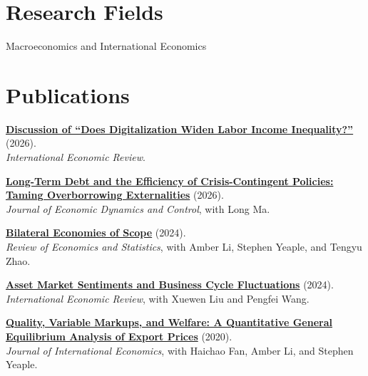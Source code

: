 \documentclass[11pt]{res}
\newcommand{\paper}[3]{\textbf{\href{#1}{#2}} (#3)}
\newenvironment{cvitem}
  {\par\noindent\hspace{-0.42in}\begin{minipage}{\linewidth}}
  {\end{minipage}\par\vspace{0.08in}}
\begin{document}
\begin{resume}
\section{\bf Research Fields}
\vspace{0.1in}
\hspace{-0.42in} Macroeconomics and International Economics

\section{\bf Publications}
\vspace{0.15in}

\begin{cvitem}
\paper{https://doi.org/10.1111/iere.70111}
  {Discussion of ``Does Digitalization Widen Labor Income Inequality?''}{2026}.\\
\textit{International Economic Review}.
\end{cvitem}

\begin{cvitem}
\paper{https://doi.org/10.1016/j.jedc.2025.105253}
  {Long-Term Debt and the Efficiency of Crisis-Contingent Policies:
  Taming Overborrowing Externalities}{2026}.\\
\textit{Journal of Economic Dynamics and Control}, with Long Ma.
\end{cvitem}

\begin{cvitem}
\paper{https://doi.org/10.1162/rest_a_01543}
  {Bilateral Economies of Scope}{2024}.\\
\textit{Review of Economics and Statistics}, with Amber Li, Stephen Yeaple,
and Tengyu Zhao.
\end{cvitem}

\begin{cvitem}
\paper{https://doi.org/10.1111/iere.12700}
  {Asset Market Sentiments and Business Cycle Fluctuations}{2024}.\\
\textit{International Economic Review}, with Xuewen Liu and Pengfei Wang.
\end{cvitem}

\begin{cvitem}
\paper{https://doi.org/10.1016/j.jinteco.2020.103317}
  {Quality, Variable Markups, and Welfare: A Quantitative General Equilibrium
  Analysis of Export Prices}{2020}.\\
\textit{Journal of International Economics}, with Haichao Fan, Amber Li,
and Stephen Yeaple.
\end{cvitem}


\end{resume}
\end{document}
